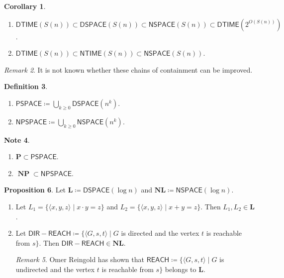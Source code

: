 \documentclass[10pt,letterpaper,cm]{nupset}
\theoremstyle{definition}
\newtheorem{definition}{Definition}[subsection]
\newtheorem{note}[definition]{Note}
\theoremstyle{theorem}
\newtheorem{prop}[definition]{Proposition}
\newtheorem{corollary}[definition]{Corollary}
\theoremstyle{remark}
\newtheorem{remark}[definition]{Remark}
\newcommand{\1}{\mathbf{1}}
\newcommand{\0}{\vec 0}
\DeclareMathOperator{\NP}{\mathbf{NP}}
\begin{document}
\begin{corollary} $ $
\begin{enumerate}
\item $\mathsf{DTIME}(S(n)) \subset \mathsf{DSPACE}(S(n)) \subset \mathsf{NSPACE}(S(n)) \subset \mathsf{DTIME}(2^{O(S(n))})$.
\item $\mathsf{DTIME}(S(n)) \subset \mathsf{NTIME}(S(n)) \subset \mathsf{NSPACE}(S(n))$.
\end{enumerate}
\end{corollary}

\begin{remark}
It is not known whether these chains of containment can be improved. 
\end{remark}

\begin{definition} $ $
\begin{enumerate}
\item $\mathsf{PSPACE} \coloneqq \bigcup_{k\geq 0} \mathsf{DSPACE}(n^k)$.
\item $\mathsf{NPSPACE} \coloneqq \bigcup_{k \geq 0} \mathsf{NSPACE}(n^k)$.
\end{enumerate}
\end{definition}

\begin{note} $ $
\begin{enumerate}
\item $\mathbf{P} \subset \mathsf{PSPACE}$.
\item $\NP \subset \mathsf{NPSPACE}$.
\end{enumerate}
\end{note}

\begin{prop}
Let $\mathbf{L} \coloneqq \mathsf{DSPACE}(\log{n})$ and $\mathbf{NL}\coloneqq \mathsf{NSPACE}(\log{n})$. 
\begin{enumerate}
\item Let $L_1 = \{\langle x,y,z \rangle \mid x \cdot y = z\}$ and $L_2 = \{\langle x,y,z \rangle \mid x+y = z\}$. Then $L_1, L_2 \in \mathbf{L}$.
\item Let $\mathsf{DIR{-}REACH} \coloneqq \{\langle G, s, t \rangle \mid G$ is directed and the vertex $t$ is reachable from $s\}$. Then $\mathsf{DIR{-}REACH}  \in \mathbf{NL}$.
\begin{remark}
Omer Reingold has shown that $\mathsf{REACH} \coloneqq  \{\langle G, s, t \rangle \mid G$ is undirected and the vertex $t$ is reachable from $s\}$ belongs to $\mathbf{L}$.
\end{remark}
\end{enumerate}
\end{prop}
\end{document}
